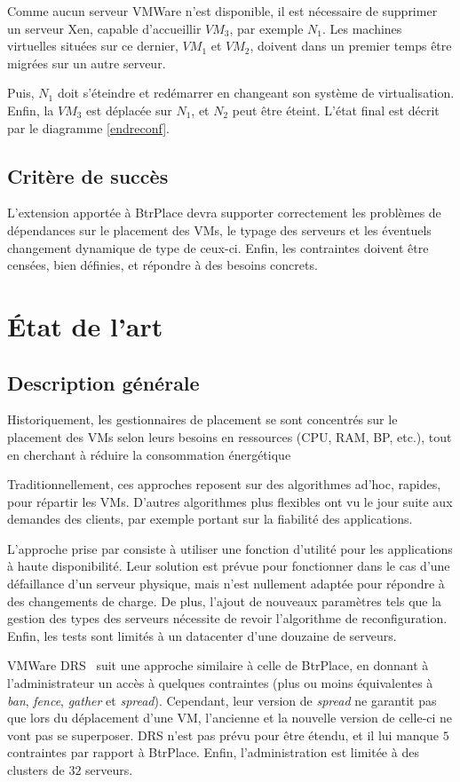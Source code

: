 \documentclass[a4paper]{article}
\begin{document}
Comme aucun serveur VMWare n'est disponible, il est nécessaire de supprimer
un serveur Xen, capable d'accueillir $VM_3$, par exemple $N_1$. Les machines
virtuelles situées sur ce dernier, $VM_1$ et $VM_2$,  doivent dans un premier
temps être migrées sur un autre serveur.

Puis, $N_1$ doit s'éteindre et redémarrer en changeant son système
de virtualisation. Enfin, la $VM_3$ est déplacée sur $N_1$, et $N_2$ peut
être éteint. L'état final est décrit par le diagramme \ref{endreconf}.

\subsection{Critère de succès}
L'extension apportée à BtrPlace devra supporter correctement les problèmes
de dépendances sur le placement des VMs, le typage des serveurs et les éventuels
changement dynamique de type de ceux-ci. Enfin, les contraintes doivent être
censées, bien définies, et répondre à des besoins concrets.

\section{État de l'art}
\subsection{Description générale}
Historiquement, les gestionnaires de placement se sont concentrés sur
le placement des VMs selon leurs besoins en ressources (CPU, RAM, BP, etc.),
tout en cherchant à réduire la consommation énergétique

Traditionnellement, ces approches reposent sur des algorithmes ad'hoc, rapides,
pour répartir les VMs. D'autres algorithmes plus flexibles ont vu le jour
suite aux demandes des clients, par exemple portant sur la fiabilité des
applications.

L'approche prise par \cite{jung2010} consiste à utiliser une fonction
d'utilité pour les applications à haute disponibilité. Leur solution
est prévue pour fonctionner dans le cas d'une défaillance d'un serveur
physique, mais n'est nullement adaptée pour répondre à des changements
de charge. De plus, l'ajout de nouveaux paramètres tels que la gestion
des types des serveurs nécessite de revoir l'algorithme de reconfiguration.
Enfin, les tests sont limités à un datacenter d'une douzaine de serveurs.

VMWare DRS~\cite{DRS} suit une approche similaire à celle de BtrPlace, en donnant
à l'administrateur un accès à quelques contraintes (plus ou moins
équivalentes à \textit{ban}, \textit{fence}, \textit{gather} et \textit{spread}).
Cependant, leur version de \textit{spread} ne garantit pas que lors
du déplacement d'une VM, l'ancienne et la nouvelle version de celle-ci
ne vont pas se superposer. DRS n'est pas prévu pour être étendu, et
il lui manque $5$ contraintes par rapport à BtrPlace. Enfin, l'administration
est limitée à des clusters de $32$ serveurs.
\end{document}
